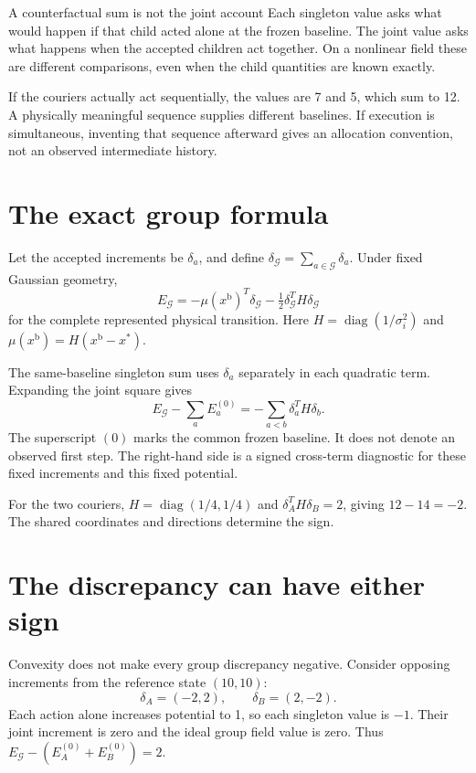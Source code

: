 \begin{cautionbox}{A counterfactual sum is not the joint account}
Each singleton value asks what would happen if that child acted alone at the frozen baseline. The joint value asks what happens when the accepted children act together. On a nonlinear field these are different comparisons, even when the child quantities are known exactly.
\end{cautionbox}

If the couriers actually act sequentially, the values are 7 and 5, which sum to 12. A physically meaningful sequence supplies different baselines. If execution is simultaneous, inventing that sequence afterward gives an allocation convention, not an observed intermediate history.

\section{The exact group formula}
Let the accepted increments be $\delta_a$, and define $\delta_{\mathcal G}=\sum_{a\in {\mathcal G}}\delta_a$. Under fixed Gaussian geometry,
\begin{equation}
 E_{\mathcal G}=-\mu(x^{\mathrm{b}})^T\delta_{\mathcal G}-\tfrac12\delta_{\mathcal G}^TH\delta_{\mathcal G}
\end{equation}
for the complete represented physical transition. Here $H=\operatorname{diag}(1/\sigma_i^2)$ and $\mu(x^{\mathrm{b}})=H(x^{\mathrm{b}}-x^*)$.

The same-baseline singleton sum uses $\delta_a$ separately in each quadratic term. Expanding the joint square gives
\begin{equation}\label{eq:group-nonadd}
 E_{\mathcal G}-\sum_a E_a^{(0)}
 =-\sum_{a<b}\delta_a^TH\delta_b.
\end{equation}
The superscript $(0)$ marks the common frozen baseline. It does not denote an observed first step. The right-hand side is a signed cross-term diagnostic for these fixed increments and this fixed potential.

For the two couriers, $H=\operatorname{diag}(1/4,1/4)$ and $\delta_A^TH\delta_B=2$, giving $12-14=-2$. The shared coordinates and directions determine the sign.


\section{The discrepancy can have either sign}
Convexity does not make every group discrepancy negative. Consider opposing increments from the reference state $(10,10)$:
\[
 \delta_A=(-2,2),\qquad\delta_B=(2,-2).
\]
Each action alone increases potential to 1, so each singleton value is $-1$. Their joint increment is zero and the ideal group field value is zero. Thus $E_{\mathcal G}-(E_A^{(0)}+E_B^{(0)})=2$.

